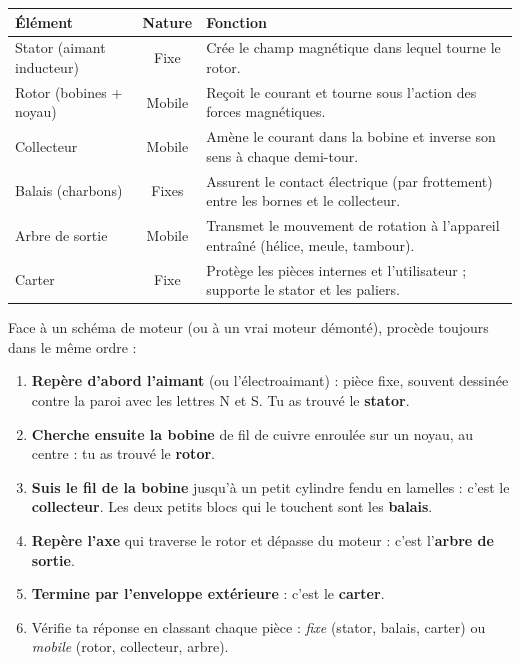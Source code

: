 \documentclass[11pt]{article}
\newcounter{popsec}
\newcounter{popsub}
\newcommand{\courssub}[1]{%
  \stepcounter{popsub}%
  \par\vspace{9pt}\noindent{\popxbold\fontsize{11.5}{13}\selectfont\color{popink}{\color{poporange}\thepopsec.\thepopsub}\hspace{6pt}#1}\par\nopagebreak\vspace{4pt}
}
\begin{document}
\courssub{Bilan : rôle de chaque élément}

\begin{aretenir}
\begin{center}
\begin{tabularx}{\linewidth}{|l|c|X|}
\hline
\rowcolor{popblueL} \textbf{Élément} & \textbf{Nature} & \textbf{Fonction} \\
\hline
Stator (aimant inducteur) & Fixe & Crée le champ magnétique dans lequel tourne le rotor. \\
\hline
Rotor (bobines + noyau) & Mobile & Reçoit le courant et tourne sous l'action des forces magnétiques. \\
\hline
Collecteur & Mobile & Amène le courant dans la bobine et inverse son sens à chaque demi-tour. \\
\hline
Balais (charbons) & Fixes & Assurent le contact électrique (par frottement) entre les bornes et le collecteur. \\
\hline
Arbre de sortie & Mobile & Transmet le mouvement de rotation à l'appareil entraîné (hélice, meule, tambour). \\
\hline
Carter & Fixe & Protège les pièces internes et l'utilisateur ; supporte le stator et les paliers. \\
\hline
\end{tabularx}
\end{center}
\end{aretenir}

\begin{methode}
Face à un schéma de moteur (ou à un vrai moteur démonté), procède toujours dans le même ordre :
\begin{enumerate}
\item \textbf{Repère d'abord l'aimant} (ou l'électroaimant) : pièce fixe, souvent dessinée contre la paroi avec les lettres N et S. Tu as trouvé le \textbf{stator}.
\item \textbf{Cherche ensuite la bobine} de fil de cuivre enroulée sur un noyau, au centre : tu as trouvé le \textbf{rotor}.
\item \textbf{Suis le fil de la bobine} jusqu'à un petit cylindre fendu en lamelles : c'est le \textbf{collecteur}. Les deux petits blocs qui le touchent sont les \textbf{balais}.
\item \textbf{Repère l'axe} qui traverse le rotor et dépasse du moteur : c'est l'\textbf{arbre de sortie}.
\item \textbf{Termine par l'enveloppe extérieure} : c'est le \textbf{carter}.
\item Vérifie ta réponse en classant chaque pièce : \emph{fixe} (stator, balais, carter) ou \emph{mobile} (rotor, collecteur, arbre).
\end{enumerate}
\end{methode}
\end{document}
